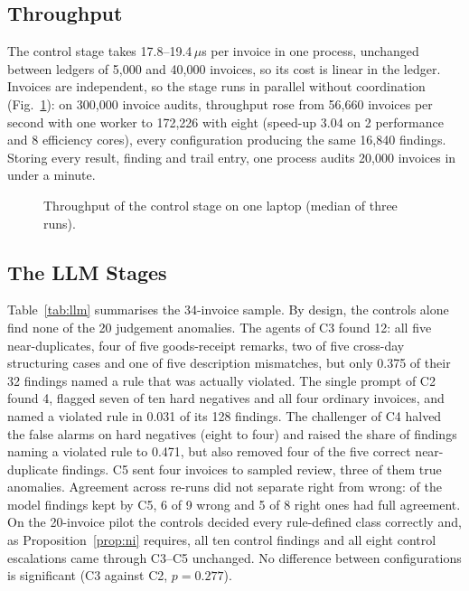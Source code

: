 \documentclass[9pt,a4paper,twocolumn]{extarticle}
\begin{document}
\subsection{Throughput}
The control stage takes 17.8--19.4\,$\mu$s per invoice in one process, unchanged between ledgers of 5{,}000 and 40{,}000 invoices, so its cost is linear in the ledger. Invoices are independent, so the stage runs in parallel without coordination (Fig.~\ref{fig:scal}): on 300{,}000 invoice audits, throughput rose from 56{,}660 invoices per second with one worker to 172{,}226 with eight (speed-up 3.04 on 2 performance and 8 efficiency cores), every configuration producing the same 16{,}840 findings. Storing every result, finding and trail entry, one process audits 20{,}000 invoices in under a minute.

\begin{figure}[t]
\centering
{}
\caption{Throughput of the control stage on one laptop (median of three runs).}
\label{fig:scal}
\end{figure}

\subsection{The LLM Stages}
Table~\ref{tab:llm} summarises the 34-invoice sample. By design, the controls alone find none of the 20 judgement anomalies. The agents of C3 found 12: all five near-duplicates, four of five goods-receipt remarks, two of five cross-day structuring cases and one of five description mismatches, but only 0.375 of their 32 findings named a rule that was actually violated. The single prompt of C2 found 4, flagged seven of ten hard negatives and all four ordinary invoices, and named a violated rule in 0.031 of its 128 findings. The challenger of C4 halved the false alarms on hard negatives (eight to four) and raised the share of findings naming a violated rule to 0.471, but also removed four of the five correct near-duplicate findings. C5 sent four invoices to sampled review, three of them true anomalies. Agreement across re-runs did not separate right from wrong: of the model findings kept by C5, 6 of 9 wrong and 5 of 8 right ones had full agreement. On the 20-invoice pilot the controls decided every rule-defined class correctly and, as Proposition~\ref{prop:ni} requires, all ten control findings and all eight control escalations came through C3--C5 unchanged. No difference between configurations is significant (C3 against C2, $p=0.277$).
\end{document}
